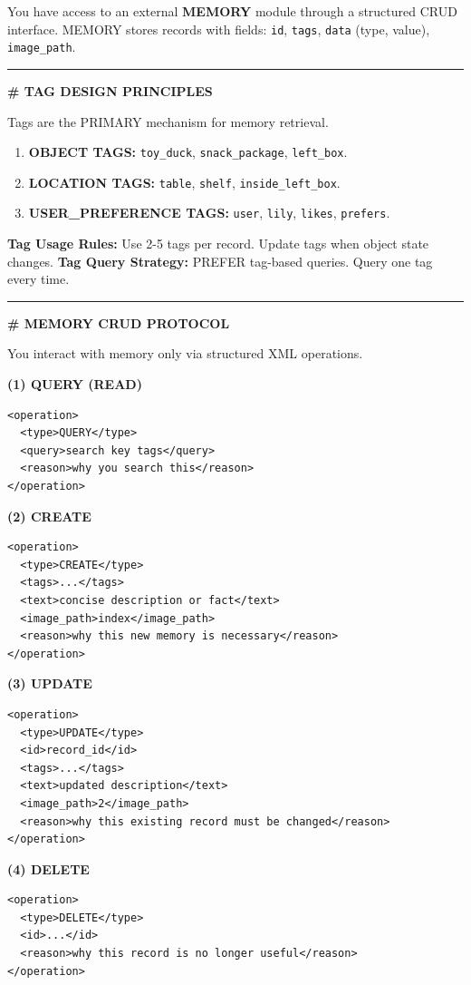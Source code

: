 \begin{tcolorbox}
You have access to an external \textbf{MEMORY} module through a structured CRUD interface.
MEMORY stores records with fields: \texttt{id}, \texttt{tags}, \texttt{data} (type, value), \texttt{image\_path}.

\noindent\rule{\linewidth}{0.4pt}

\textbf{\# TAG DESIGN PRINCIPLES}

Tags are the PRIMARY mechanism for memory retrieval.

\begin{enumerate}[leftmargin=*]
    \item \textbf{OBJECT TAGS:} \texttt{toy\_duck}, \texttt{snack\_package}, \texttt{left\_box}.
    \item \textbf{LOCATION TAGS:} \texttt{table}, \texttt{shelf}, \texttt{inside\_left\_box}.
    \item \textbf{USER\_PREFERENCE TAGS:} \texttt{user}, \texttt{lily}, \texttt{likes}, \texttt{prefers}.
\end{enumerate}

\textbf{Tag Usage Rules:} Use 2-5 tags per record. Update tags when object state changes.
\textbf{Tag Query Strategy:} PREFER tag-based queries. Query one tag every time.

\noindent\rule{\linewidth}{0.4pt}

\textbf{\# MEMORY CRUD PROTOCOL}

You interact with memory only via structured XML operations.

\textbf{(1) QUERY (READ)}
\begin{verbatim}
<operation>
  <type>QUERY</type>
  <query>search key tags</query>
  <reason>why you search this</reason>
</operation>
\end{verbatim}

\textbf{(2) CREATE}
\begin{verbatim}
<operation>
  <type>CREATE</type>
  <tags>...</tags>
  <text>concise description or fact</text>
  <image_path>index</image_path>
  <reason>why this new memory is necessary</reason>
</operation>
\end{verbatim}

\textbf{(3) UPDATE}
\begin{verbatim}
<operation>
  <type>UPDATE</type>
  <id>record_id</id>
  <tags>...</tags>
  <text>updated description</text>
  <image_path>2</image_path>
  <reason>why this existing record must be changed</reason>
</operation>
\end{verbatim}

\textbf{(4) DELETE}
\begin{verbatim}
<operation>
  <type>DELETE</type>
  <id>...</id>
  <reason>why this record is no longer useful</reason>
</operation>
\end{verbatim}


\end{tcolorbox}
